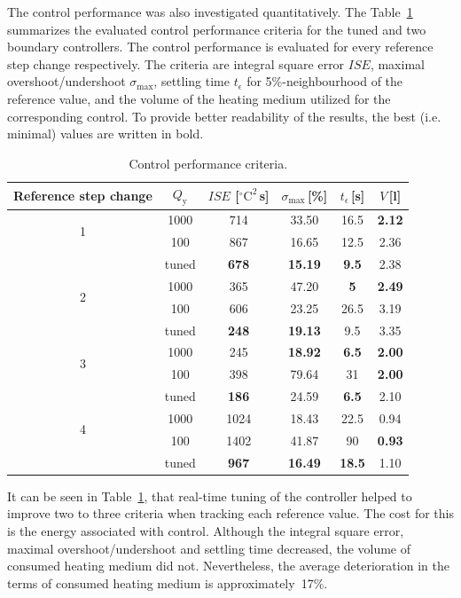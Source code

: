 \documentclass[preprint,12pt]{elsarticle}
\begin{document}
The control performance was also investigated quantitatively. The Table~\ref{tab:control_performance} summarizes the evaluated control performance criteria for the tuned and two boundary controllers. The control performance is evaluated for every reference step change respectively. The criteria are integral square error $ISE$, maximal overshoot/undershoot $\sigma_{\mathrm{max}}$, settling time $t_{\epsilon}$ for 5\%-neighbourhood of the reference value, and the volume of the heating medium utilized for the corresponding control. To provide better readability of the results, the best (i.e. minimal) values are written in bold. 

\begin{table}[h!]
	\begin{center}
		\caption{Control performance criteria.}
		\label{tab:control_performance}
		\begin{tabular}{c|c|c|c|c|c} 
			Reference step change & $Q_\mathrm{y}$ & $ISE$ [$^{\circ}\mathrm{C}^2$\,s] & $\sigma_{\mathrm{max}}$\,[\%] & $t_{\epsilon}$\,[s] & $V$\,[l] \\
			\hline
			\multirow{2}{*}{1} & 1000 & 714 & 33.50 & 16.5 & \textbf{2.12} \\
			    & 100 & 867 & 16.65 & 12.5 & 2.36 \\ 
			    & tuned & \textbf{678} & \textbf{15.19} & \textbf{9.5} & 2.38 \\ 
			\hline
			\multirow{2}{*}{2} & 1000 & 365 & 47.20 & \textbf{5} & \textbf{2.49} \\
			    & 100 & 606 & 23.25 & 26.5 & 3.19 \\ 
			    & tuned & \textbf{248} & \textbf{19.13} & 9.5 & 3.35 \\ 
			\hline
		    \multirow{2}{*}{3} & 1000 & 245 & \textbf{18.92} & \textbf{6.5} & \textbf{2.00} \\
				& 100 & 398 & 79.64 & 31 & \textbf{2.00} \\ 
				& tuned & \textbf{186} & 24.59 & \textbf{6.5} & 2.10 \\ 
			\hline
			\multirow{2}{*}{4} & 1000 & 1024 & 18.43 & 22.5 & 0.94 \\
				& 100 & 1402 & 41.87 & 90 & \textbf{0.93} \\ 
				& tuned & \textbf{967} & \textbf{16.49} & \textbf{18.5} & 1.10  
		\end{tabular}
	\end{center}
\end{table}

It can be seen in Table~\ref{tab:control_performance}, that real-time tuning of the controller helped to improve two to three criteria when tracking each reference value. The cost for this is the energy associated with control. Although the integral square error, maximal overshoot/undershoot and settling time decreased, the volume of consumed heating medium did not. Nevertheless, the average deterioration in the terms of consumed heating medium is approximately~17\%. 
\end{document}
